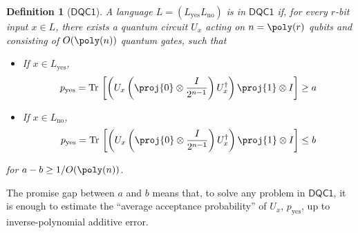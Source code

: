 \documentclass[11pt]{article}
\numberwithin{equation}{section}
\def\Tr{{\rm Tr}\,}
\newcommand{\DQC}{\mathsf{DQC1}}
\renewcommand\( {\left(}
\renewcommand\) {\right)}
\newtheorem{definition}{Definition}
\begin{document}
\begin{definition}[$\DQC$]\label{def:DQC1}
A language $L = (L_{\text{yes}} L_{\text{no}})$ is in $\DQC$ if, for every $r$-bit input $x \in L$, there exists a quantum circuit $U_x$ acting on $n = \poly(r)$ qubits and consisting of $O(\poly(n))$ quantum gates, such that 
\begin{itemize}
	\item If $x \in L_{\text{yes}}$, \[p_{\text{yes}} = \Tr\left[ \left( U_x \left( \proj{0} \otimes \frac{I}{2^{n-1}} \right) U_x^\dag \right) \proj{1} \otimes I \right] \geq a\]
	\item If $x \in L_{\text{no}}$, \[p_{\text{yes}} = \Tr\left[ \left( U_x \left( \proj{0} \otimes \frac{I}{2^{n-1}} \right) U_x^\dag \right) \proj{1} \otimes I \right] \leq b\]
\end{itemize}
for $a - b \geq 1/O(\poly(n))$.
\end{definition}
The promise gap between $a$ and $b$ means that, to solve any problem in $\DQC$, it is enough to estimate the ``average acceptance probability'' of $U_x$, $p_{\text{yes}}$, up to inverse-polynomial additive error.








\end{document}
